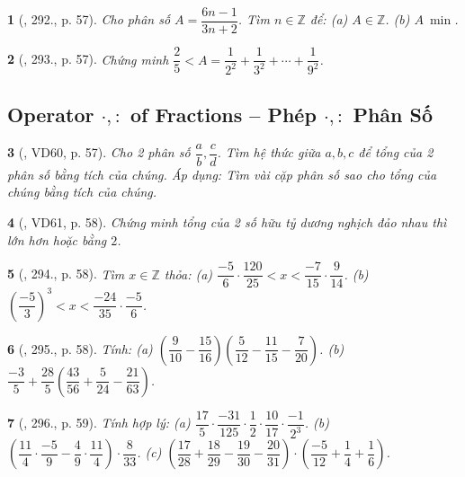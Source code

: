 \documentclass{article}
\newtheorem{baitoan}{}
\begin{document}
\begin{baitoan}[\cite{Tuyen_Toan_6}, 292., p. 57]
	Cho phân số $A = \dfrac{6n - 1}{3n + 2}$. Tìm $n\in\mathbb{Z}$ để: (a) $A\in\mathbb{Z}$. (b) $A\ \min$.
\end{baitoan}

\begin{baitoan}[\cite{Tuyen_Toan_6}, 293., p. 57]
	Chứng minh $\dfrac{2}{5} < A = \dfrac{1}{2^2} + \dfrac{1}{3^2} + \cdots + \dfrac{1}{9^2}$.
\end{baitoan}

\subsection{Operator $\cdot,:$ of Fractions -- Phép $\cdot,:$ Phân Số}

\begin{baitoan}[\cite{Tuyen_Toan_6}, VD60, p. 57]
	Cho 2 phân số $\dfrac{a}{b},\dfrac{c}{d}$. Tìm hệ thức giữa $a,b,c$ để tổng của 2 phân số bằng tích của chúng. Áp dụng: Tìm vài cặp phân số sao cho tổng của chúng bằng tích của chúng.
\end{baitoan}

\begin{baitoan}[\cite{Tuyen_Toan_6}, VD61, p. 58]
	Chứng minh tổng của 2 số hữu tỷ dương nghịch đảo nhau thì lớn hơn hoặc bằng $2$.
\end{baitoan}

\begin{baitoan}[\cite{Tuyen_Toan_6}, 294., p. 58]
	Tìm $x\in\mathbb{Z}$ thỏa: (a) $\dfrac{-5}{6}\cdot\dfrac{120}{25} < x < \dfrac{-7}{15}\cdot\dfrac{9}{14}$. (b) $\left(\dfrac{-5}{3}\right)^3 < x < \dfrac{-24}{35}\cdot\dfrac{-5}{6}$.
\end{baitoan}

\begin{baitoan}[\cite{Tuyen_Toan_6}, 295., p. 58]
	Tính: (a) $\left(\dfrac{9}{10} - \dfrac{15}{16}\right)\left(\dfrac{5}{12} - \dfrac{11}{15} - \dfrac{7}{20}\right)$. (b) $\dfrac{-3}{5} + \dfrac{28}{5}\left(\dfrac{43}{56} + \dfrac{5}{24} - \dfrac{21}{63}\right)$.
\end{baitoan}

\begin{baitoan}[\cite{Tuyen_Toan_6}, 296., p. 59]
	Tính hợp lý: (a) $\dfrac{17}{5}\cdot\dfrac{-31}{125}\cdot\dfrac{1}{2}\cdot\dfrac{10}{17}\cdot\dfrac{-1}{2^3}$. (b) $\left(\dfrac{11}{4}\cdot\dfrac{-5}{9} - \dfrac{4}{9}\cdot\dfrac{11}{4}\right)\cdot\dfrac{8}{33}$. (c) $\left(\dfrac{17}{28} + \dfrac{18}{29} - \dfrac{19}{30} - \dfrac{20}{31}\right)\cdot\left(\dfrac{-5}{12} + \dfrac{1}{4} + \dfrac{1}{6}\right)$.
\end{baitoan}
\end{document}

